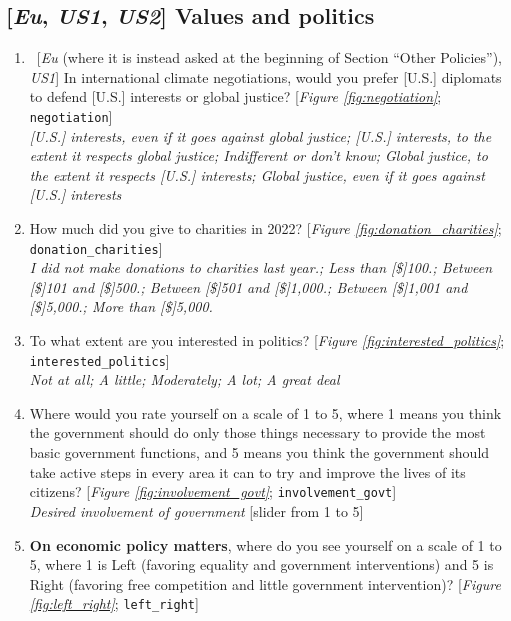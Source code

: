 \subsection*{[\textit{Eu}, \textit{US1}, \textit{US2}] Values and politics}
\begin{enumerate}[resume] \item ~[\textit{Eu} (where it is instead asked at the beginning of Section ``Other Policies''), \textit{US1}]  \label{q:negotiation} In international climate negotiations, would you prefer [U.S.] diplomats to defend [U.S.] interests or global justice? [\textit{Figure \ref{fig:negotiation}}; \verb|negotiation|]
\\ \textit{[U.S.] interests, even if it goes against global justice; [U.S.] interests, to the extent it respects global justice; Indifferent or don't know; Global justice, to the extent it respects [U.S.] interests; Global justice, even if it goes against [U.S.] interests}
\item  \label{q:donation_charities} How much did you give to charities in 2022? [\textit{Figure \ref{fig:donation_charities}}; \verb|donation_charities|]
\\ \textit{I did not make donations to charities last year.; Less than [\$]100.; Between [\$]101 and [\$]500.; Between [\$]501 and [\$]1,000.; Between [\$]1,001 and [\$]5,000.; More than [\$]5,000.}
\item  \label{q:interested_politics} To what extent are you interested in politics? [\textit{Figure \ref{fig:interested_politics}}; \verb|interested_politics|]
\\ \textit{Not at all; A little; Moderately; A lot; A great deal}
\item  \label{q:involvement_govt} Where would you rate yourself on a scale of 1 to 5, where 1 means you think the government should do only those things necessary to provide the most basic government functions, and 5 means you think the government should take active steps in every area it can to try and improve the lives of its citizens? [\textit{Figure \ref{fig:involvement_govt}}; \verb|involvement_govt|]
\\ \textit{Desired involvement of government} [slider from 1 to 5]
\item  \label{q:left_right} \textbf{On economic policy matters}, where do you see yourself on a scale of 1 to 5, where 1 is Left (favoring equality and government interventions) and 5 is Right (favoring free competition and little government intervention)? [\textit{Figure \ref{fig:left_right}}; \verb|left_right|]

\end{enumerate}
